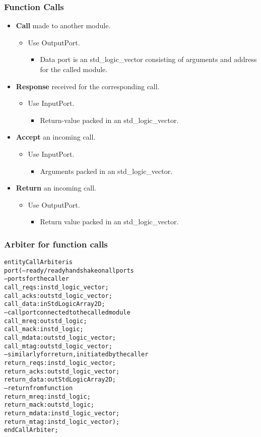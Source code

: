 \documentclass{beamer}
\begin{document}
\begin{frame}
  \frametitle{Function Calls}
  \begin{itemize}
  \item {\bf Call} made to another module.
    \begin{itemize}
    \item Use OutputPort.
      \begin{itemize}
      \item Data port is  an std\_logic\_vector consisting of
        arguments and address for the called module.
      \end{itemize}
    \end{itemize}
  \item {\bf Response} received for the corresponding call.
    \begin{itemize}
      \item Use InputPort.
        \begin{itemize}
        \item Return-value packed in an std\_logic\_vector.
        \end{itemize}
    \end{itemize}
  \item {\bf Accept} an incoming call.
    \begin{itemize}
    \item Use InputPort.
      \begin{itemize}
      \item Arguments packed in an std\_logic\_vector.
      \end{itemize}
    \end{itemize}
  \item {\bf Return} an incoming call.
    \begin{itemize}
    \item Use OutputPort.
      \begin{itemize}
      \item Return value packed in an std\_logic\_vector.
      \end{itemize}
    \end{itemize}
  \end{itemize}
\end{frame}

\begin{frame}[fragile]
  \frametitle{Arbiter for function calls}
\small
\begin{alltt}
entity CallArbiter is
  port ( -- ready/ready handshake on all ports
    -- ports for the caller
    call_reqs   : in  std_logic_vector;
    call_acks   : out std_logic_vector;
    call_data   : in  StdLogicArray2D;
    -- call port connected to the called module
    call_mreq   : out std_logic;
    call_mack   : in  std_logic;
    call_mdata  : out std_logic_vector;
    call_mtag   : out std_logic_vector;
    -- similarly for return, initiated by the caller
    return_reqs : in  std_logic_vector;
    return_acks : out std_logic_vector;
    return_data : out StdLogicArray2D;
    -- return from function 
    return_mreq : in std_logic;
    return_mack : out std_logic;
    return_mdata : in  std_logic_vector;
    return_mtag : in  std_logic_vector);
end CallArbiter;
\end{alltt}
\end{frame}
\end{document}
